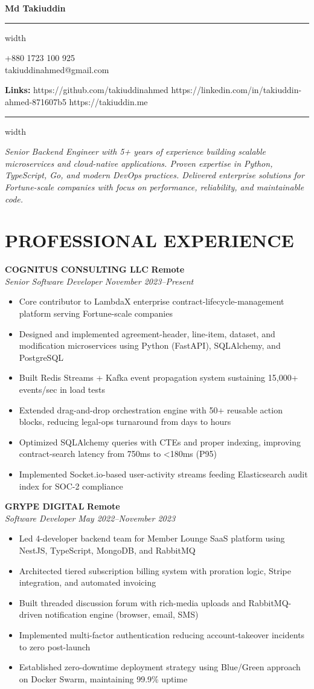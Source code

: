 \documentclass[11pt,letterpaper]{article}
\newcommand{\name}[1]{
  \begin{center}
    \Huge\textbf{#1}
  \end{center}
  \vspace{-0.5em}
  \hrule height 0.4pt width \textwidth
  \vspace{0.5em}
}
\newcommand{\contact}[5]{
  \begin{center}
    #1 \\
    #2 
  \end{center}
  \begin{center}
    \textbf{Links:} #3 \textbullet{} #4 \textbullet{} #5
  \end{center}
  \vspace{-0.5em}
  \hrule height 0.4pt width \textwidth
  \vspace{0.5em}
}
\newcommand{\role}[4]{
  \begin{center}
  \textbf{#1} \hfill \textbf{#2} \\
  \textit{#3} \hfill \textit{#4}
  \end{center}
}
\begin{document}
\name{Md Takiuddin}
\vspace{-0.5em}
\contact{+880 1723 100 925}{takiuddinahmed@gmail.com}{https://github.com/takiuddinahmed}{https://linkedin.com/in/takiuddin-ahmed-871607b5}{https://takiuddin.me}


\vspace{-0.5em}
\begin{center}
\textit{Senior Backend Engineer with 5+ years of experience building scalable microservices and cloud-native applications. Proven expertise in Python, TypeScript, Go, and modern DevOps practices. Delivered enterprise solutions for Fortune-scale companies with focus on performance, reliability, and maintainable code.}
\end{center}

\section{PROFESSIONAL EXPERIENCE}

\vspace{1em}
\role{COGNITUS CONSULTING LLC}{Remote}{Senior Software Developer}{November 2023--Present}
\begin{itemize}[leftmargin=*,nosep]
  \item Core contributor to LambdaX enterprise contract-lifecycle-management platform serving Fortune-scale companies
  \item Designed and implemented agreement-header, line-item, dataset, and modification microservices using Python (FastAPI), SQLAlchemy, and PostgreSQL
  \item Built Redis Streams + Kafka event propagation system sustaining 15,000+ events/sec in load tests
  \item Extended drag-and-drop orchestration engine with 50+ reusable action blocks, reducing legal-ops turnaround from days to hours
  \item Optimized SQLAlchemy queries with CTEs and proper indexing, improving contract-search latency from 750ms to <180ms (P95)
  \item Implemented Socket.io-based user-activity streams feeding Elasticsearch audit index for SOC-2 compliance
\end{itemize}

\role{GRYPE DIGITAL}{Remote}{Software Developer}{May 2022--November 2023}
\begin{itemize}[leftmargin=*,nosep,topsep=0pt]
  \item Led 4-developer backend team for Member Lounge SaaS platform using NestJS, TypeScript, MongoDB, and RabbitMQ
  \item Architected tiered subscription billing system with proration logic, Stripe integration, and automated invoicing
  \item Built threaded discussion forum with rich-media uploads and RabbitMQ-driven notification engine (browser, email, SMS)
  \item Implemented multi-factor authentication reducing account-takeover incidents to zero post-launch
  \item Established zero-downtime deployment strategy using Blue/Green approach on Docker Swarm, maintaining 99.9\% uptime
\end{itemize}
\end{document}
